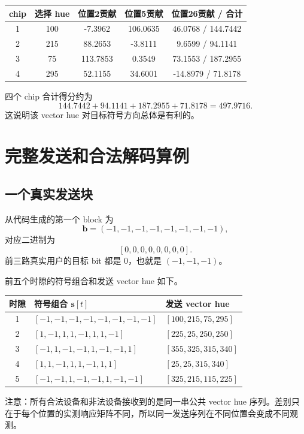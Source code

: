 \documentclass[UTF8,a4paper,11pt]{ctexart}
\begin{document}
\begin{center}
\begin{tabular}{ccccc}
\toprule
chip & 选择 hue & 位置2贡献 & 位置5贡献 & 位置26贡献 / 合计\\
\midrule
1 & 100 & -7.3962 & 106.0635 & 46.0768 / 144.7442\\
2 & 215 & 88.2653 & -3.8111 & 9.6599 / 94.1141\\
3 & 75 & 113.7853 & 0.3549 & 73.1553 / 187.2955\\
4 & 295 & 52.1155 & 34.6001 & -14.8979 / 71.8178\\
\bottomrule
\end{tabular}
\end{center}

四个 chip 合计得分约为
\[
144.7442+94.1141+187.2955+71.8178=497.9716.
\]
这说明该 vector hue 对目标符号方向总体是有利的。

\section{完整发送和合法解码算例}

\subsection{一个真实发送块}

从代码生成的第一个 block 为
\[
\mathbf{b}=(-1,-1,-1,-1,-1,-1,-1,-1),
\]
对应二进制为
\[
[0,0,0,0,0,0,0,0].
\]
前三路真实用户的目标 bit 都是 0，也就是 $(-1,-1,-1)$。

前五个时隙的符号组合和发送 vector hue 如下。

\begin{center}
\begin{tabular}{c>{\raggedright\arraybackslash}p{6.8cm}>{\raggedright\arraybackslash}p{4.2cm}}
\toprule
时隙 & 符号组合 $\mathbf{s}[t]$ & 发送 vector hue\\
\midrule
1 & $[-1,-1,-1,-1,-1,-1,-1,-1]$ & $[100,215,75,295]$\\
2 & $[1,-1,1,1,-1,1,1,-1]$ & $[225,25,250,250]$\\
3 & $[-1,1,-1,-1,1,-1,-1,1]$ & $[355,325,315,340]$\\
4 & $[1,1,-1,1,1,-1,1,1]$ & $[25,25,315,340]$\\
5 & $[-1,-1,1,-1,-1,1,-1,-1]$ & $[325,215,115,225]$\\
\bottomrule
\end{tabular}
\end{center}

注意：所有合法设备和非法设备接收到的是同一串公共 vector hue 序列。差别只在于每个位置的实测响应矩阵不同，所以同一发送序列在不同位置会变成不同观测。
\end{document}
